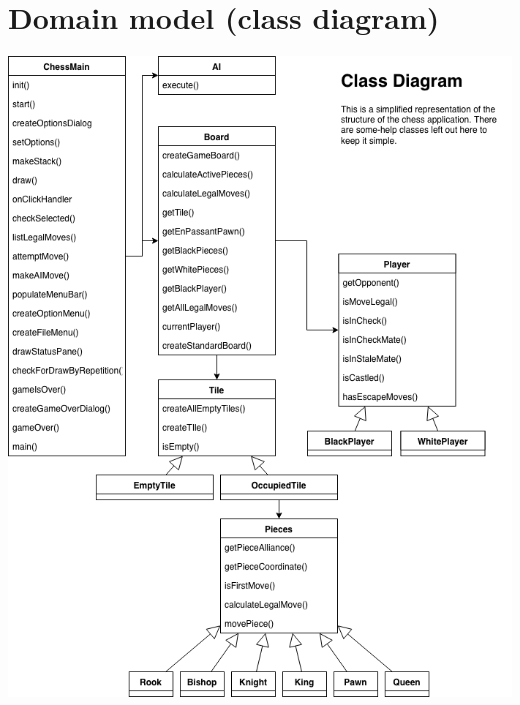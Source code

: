 \documentclass{article}
\begin{document}
    \section{Domain model (class diagram)}
    \begin{center}
    \includegraphics[scale=0.38]{class-diagram.png}
    \end{center}
    
\end{document}
